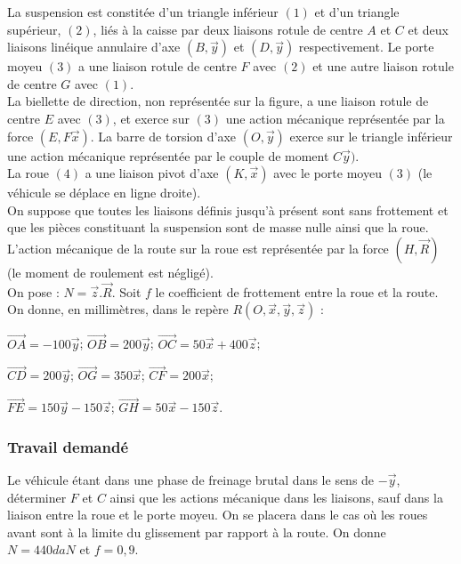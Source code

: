La suspension est constitée d'un triangle inférieur $(1)$ et d'un triangle supérieur, $(2)$, liés à la caisse par deux liaisons rotule de centre $A$ et $C$ et deux liaisons linéique annulaire d'axe $(B,\overrightarrow{y})$ et $(D,\overrightarrow{y})$ respectivement. Le porte moyeu $(3)$ a une liaison rotule de centre $F$ avec $(2)$ et une autre liaison rotule de centre $G$ avec $(1)$.\\
La biellette de direction, non représentée sur la figure, a une liaison rotule de centre $E$ avec $(3)$, et exerce sur $(3)$ une action mécanique représentée par la force $(E,F\overrightarrow{x})$. La barre de torsion d'axe $(O,\overrightarrow{y})$ exerce sur le triangle inférieur une action mécanique représentée par le couple de moment $C\overrightarrow{y})$.\\
La roue $(4)$ a une liaison pivot d'axe $(K,\overrightarrow{x})$ avec le porte moyeu $(3)$ (le véhicule se déplace en ligne droite).\\
On suppose que toutes les liaisons définis jusqu'à présent sont sans frottement et que les pièces constituant la suspension sont de masse nulle ainsi que la roue.\\
L'action mécanique de la route sur la roue est représentée par la force $(H,\overrightarrow{R})$ (le moment de roulement est négligé).\\
On pose : $N=\overrightarrow{z}.\overrightarrow{R}$. Soit $f$ le coefficient de frottement entre la roue et la route.\\
On donne, en millimètres, dans le repère $R(O,\overrightarrow{x},\overrightarrow{y},\overrightarrow{z})$ :
\begin{description}
\item $\overrightarrow{OA}=-100\overrightarrow{y}$; $\overrightarrow{OB}=200\overrightarrow{y}$; $\overrightarrow{OC}=50\overrightarrow{x}+400\overrightarrow{z}$;
\item $\overrightarrow{CD}=200\overrightarrow{y}$; $\overrightarrow{OG}=350\overrightarrow{x}$; $\overrightarrow{CF}=200\overrightarrow{x}$;
\item $\overrightarrow{FE}=150\overrightarrow{y}-150\overrightarrow{z}$; $\overrightarrow{GH}=50\overrightarrow{x}-150\overrightarrow{z}$.
\end{description}

\subsubsection{Travail demandé}
Le véhicule étant dans une phase de freinage brutal dans le sens de $-\overrightarrow{y}$, déterminer $F$ et $C$ ainsi que les actions mécanique dans les liaisons, sauf dans la liaison entre la roue et le porte moyeu. On se placera dans le cas où les roues avant sont à la limite du glissement par rapport à la route. On donne $N=440 daN$ et $f=0,9$.


